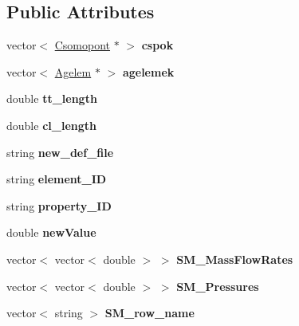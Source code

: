 \subsection*{Public Attributes}
\begin{DoxyCompactItemize}
\item 
\hypertarget{class_staci_a1b5c85269be922a1ed62890cd88e67db}{}\label{class_staci_a1b5c85269be922a1ed62890cd88e67db} 
vector$<$ \hyperlink{class_csomopont}{Csomopont} $\ast$ $>$ {\bfseries cspok}
\item 
\hypertarget{class_staci_a6ca23dec6bf9e864efe535d836b7d02d}{}\label{class_staci_a6ca23dec6bf9e864efe535d836b7d02d} 
vector$<$ \hyperlink{class_agelem}{Agelem} $\ast$ $>$ {\bfseries agelemek}
\item 
\hypertarget{class_staci_a23892863b8dba7d6493cbf474042f900}{}\label{class_staci_a23892863b8dba7d6493cbf474042f900} 
double {\bfseries tt\+\_\+length}
\item 
\hypertarget{class_staci_acaa2f299629d12a61ab95b8522ef291a}{}\label{class_staci_acaa2f299629d12a61ab95b8522ef291a} 
double {\bfseries cl\+\_\+length}
\item 
\hypertarget{class_staci_a2b3fec06ed59e026c2c34b7f82bf32e7}{}\label{class_staci_a2b3fec06ed59e026c2c34b7f82bf32e7} 
string {\bfseries new\+\_\+def\+\_\+file}
\item 
\hypertarget{class_staci_a257ffac68d249e9ad21b982b8ea995c5}{}\label{class_staci_a257ffac68d249e9ad21b982b8ea995c5} 
string {\bfseries element\+\_\+\+ID}
\item 
\hypertarget{class_staci_a9978fa86e2702420213256cd41e5de39}{}\label{class_staci_a9978fa86e2702420213256cd41e5de39} 
string {\bfseries property\+\_\+\+ID}
\item 
\hypertarget{class_staci_a52df2bacb03971d6b49f28b5d57d8db5}{}\label{class_staci_a52df2bacb03971d6b49f28b5d57d8db5} 
double {\bfseries new\+Value}
\item 
\hypertarget{class_staci_aa4c3b6e4e9c54ab81cfb9e33ad2b26f8}{}\label{class_staci_aa4c3b6e4e9c54ab81cfb9e33ad2b26f8} 
vector$<$ vector$<$ double $>$ $>$ {\bfseries S\+M\+\_\+\+Mass\+Flow\+Rates}
\item 
\hypertarget{class_staci_a9e91205defa3e90dbfb6e93e229d3ee2}{}\label{class_staci_a9e91205defa3e90dbfb6e93e229d3ee2} 
vector$<$ vector$<$ double $>$ $>$ {\bfseries S\+M\+\_\+\+Pressures}
\item 
\hypertarget{class_staci_ae5c1647a9b240fbcd91a684570c422e5}{}\label{class_staci_ae5c1647a9b240fbcd91a684570c422e5} 
vector$<$ string $>$ {\bfseries S\+M\+\_\+row\+\_\+name}

\end{DoxyCompactItemize}
